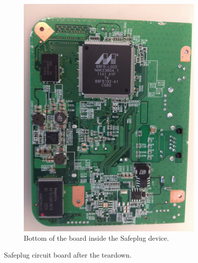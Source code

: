 \begin{figure}[htb]
\begin{subfigure}[b]{.3\textwidth}
\includegraphics[width=\textwidth]{safeplug_bottom}
\caption{Bottom of the board inside the Safeplug device.}
\label{fig:bottom}
\end{subfigure}
\caption{Safeplug circuit board after the teardown.}
\end{figure}
